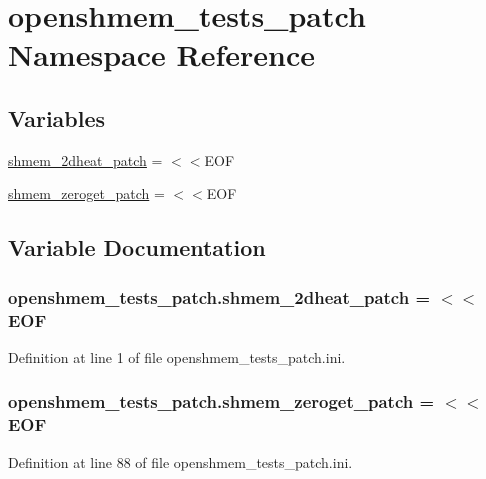 \hypertarget{namespaceopenshmem__tests__patch}{\section{openshmem\-\_\-tests\-\_\-patch Namespace Reference}
\label{namespaceopenshmem__tests__patch}
}
\subsection*{Variables}
\begin{DoxyCompactItemize}
\item 
\hyperlink{namespaceopenshmem__tests__patch_a391991e1010e023b4787fba54765e3b1}{shmem\-\_\-2dheat\-\_\-patch} = $<$$<$E\-O\-F
\item 
\hyperlink{namespaceopenshmem__tests__patch_a3aaaf9e5a26acd1ddc1ed38bee8c1366}{shmem\-\_\-zeroget\-\_\-patch} = $<$$<$E\-O\-F
\end{DoxyCompactItemize}


\subsection{Variable Documentation}
\hypertarget{namespaceopenshmem__tests__patch_a391991e1010e023b4787fba54765e3b1}{
\subsubsection[{shmem\-\_\-2dheat\-\_\-patch}]{\setlength{\rightskip}{0pt plus 5cm}openshmem\-\_\-tests\-\_\-patch.\-shmem\-\_\-2dheat\-\_\-patch = $<$$<$E\-O\-F}}\label{namespaceopenshmem__tests__patch_a391991e1010e023b4787fba54765e3b1}


Definition at line 1 of file openshmem\-\_\-tests\-\_\-patch.\-ini.

\hypertarget{namespaceopenshmem__tests__patch_a3aaaf9e5a26acd1ddc1ed38bee8c1366}{
\subsubsection[{shmem\-\_\-zeroget\-\_\-patch}]{\setlength{\rightskip}{0pt plus 5cm}openshmem\-\_\-tests\-\_\-patch.\-shmem\-\_\-zeroget\-\_\-patch = $<$$<$E\-O\-F}}\label{namespaceopenshmem__tests__patch_a3aaaf9e5a26acd1ddc1ed38bee8c1366}


Definition at line 88 of file openshmem\-\_\-tests\-\_\-patch.\-ini.

